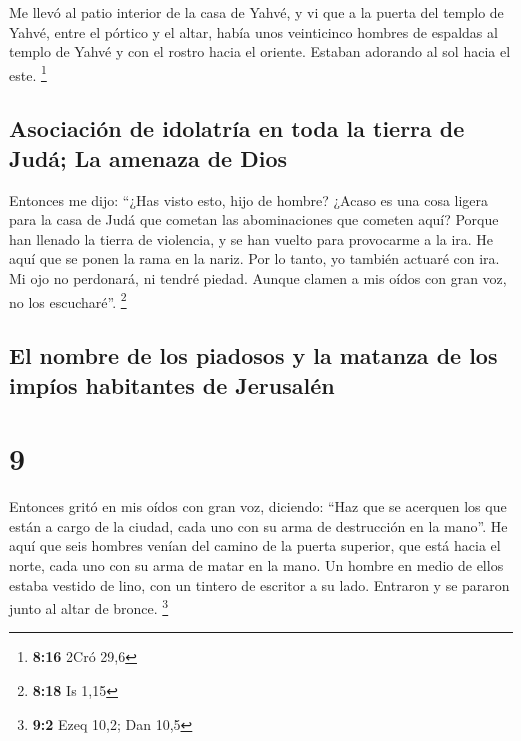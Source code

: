  Me llevó al patio interior de la casa de Yahvé, y vi que
a la puerta del templo de Yahvé, entre el pórtico y el altar, había unos
veinticinco hombres de espaldas al templo de Yahvé y con el rostro hacia
el oriente. Estaban adorando al sol hacia el este. \footnote{\textbf{8:16}
  2Cró 29,6}

\hypertarget{asociaciuxf3n-de-idolatruxeda-en-toda-la-tierra-de-juduxe1-la-amenaza-de-dios}{%
\subsection{Asociación de idolatría en toda la tierra de Judá; La
amenaza de
Dios}\label{asociaciuxf3n-de-idolatruxeda-en-toda-la-tierra-de-juduxe1-la-amenaza-de-dios}}

 Entonces me dijo: ``¿Has visto esto, hijo de hombre?
¿Acaso es una cosa ligera para la casa de Judá que cometan las
abominaciones que cometen aquí? Porque han llenado la tierra de
violencia, y se han vuelto para provocarme a la ira. He aquí que se
ponen la rama en la nariz.  Por lo tanto, yo también
actuaré con ira. Mi ojo no perdonará, ni tendré piedad. Aunque clamen a
mis oídos con gran voz, no los escucharé''. \footnote{\textbf{8:18} Is
  1,15}

\hypertarget{el-nombre-de-los-piadosos-y-la-matanza-de-los-impuxedos-habitantes-de-jerusaluxe9n}{%
\subsection{El nombre de los piadosos y la matanza de los impíos
habitantes de
Jerusalén}\label{el-nombre-de-los-piadosos-y-la-matanza-de-los-impuxedos-habitantes-de-jerusaluxe9n}}

\hypertarget{section-8}{%
\section{9}\label{section-8}}

 Entonces gritó en mis oídos con gran voz, diciendo: ``Haz
que se acerquen los que están a cargo de la ciudad, cada uno con su arma
de destrucción en la mano''.  He aquí que seis hombres
venían del camino de la puerta superior, que está hacia el norte, cada
uno con su arma de matar en la mano. Un hombre en medio de ellos estaba
vestido de lino, con un tintero de escritor a su lado. Entraron y se
pararon junto al altar de bronce. \footnote{\textbf{9:2} Ezeq 10,2; Dan
  10,5}


